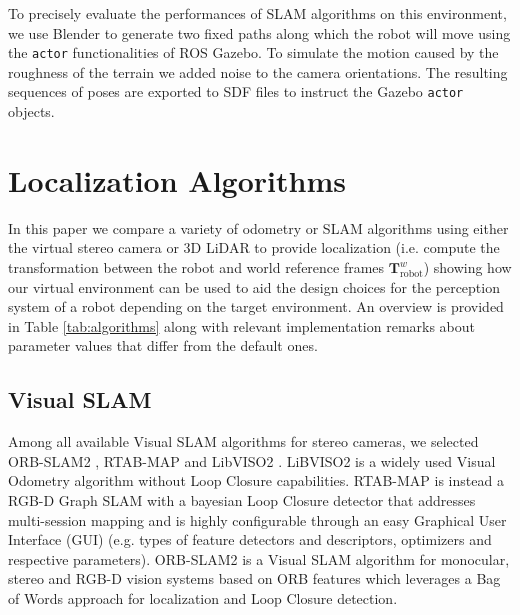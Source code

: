 \documentclass[conference]{IEEEtran}  %
\newcommand{\scmargin}[2]{{\color{green}#1}\marginpar{\color{green}\raggedright\footnotesize [SC]: #2}}
\begin{document}
To precisely evaluate the performances of SLAM algorithms on this environment, we use Blender to generate two fixed paths along which the robot will move using the \texttt{actor} functionalities of ROS Gazebo.
To simulate the motion caused by the roughness of the terrain we added noise to the camera orientations.
The resulting sequences of poses are exported to
SDF files to instruct the Gazebo \texttt{actor} objects.

\section{Localization Algorithms}\label{sec::loc_alg}
In this paper we compare a variety of odometry or SLAM algorithms using either the virtual stereo camera or 3D LiDAR to provide localization (i.e. compute the transformation between the robot and world reference frames $\mathbf{T}_\text{robot}^{w}$) showing how our virtual environment can be used to aid the design choices for the perception system of a robot depending on the target environment. An overview is provided in Table \ref{tab:algorithms} along with relevant implementation remarks about parameter values that differ from the default ones.

\subsection{Visual SLAM}
Among all available Visual SLAM algorithms for stereo cameras, we selected ORB-SLAM2 \cite{mur2017visual}, RTAB-MAP \cite{labbe2019rtab} and LibVISO2 \cite{Geiger2011IV}. LiBVISO2 is a widely used Visual Odometry algorithm without Loop Closure capabilities. RTAB-MAP is instead a RGB-D Graph SLAM with a bayesian Loop Closure detector that addresses multi-session mapping and is highly configurable through an easy Graphical User Interface (GUI) (e.g. types of feature detectors and descriptors, optimizers and respective parameters). ORB-SLAM2 is a Visual SLAM algorithm for monocular, stereo and RGB-D vision systems based on ORB features \cite{rublee2011orb} which leverages a Bag of Words approach \cite{Methods::GalvezTRO12} for localization and Loop Closure detection.
\end{document}
